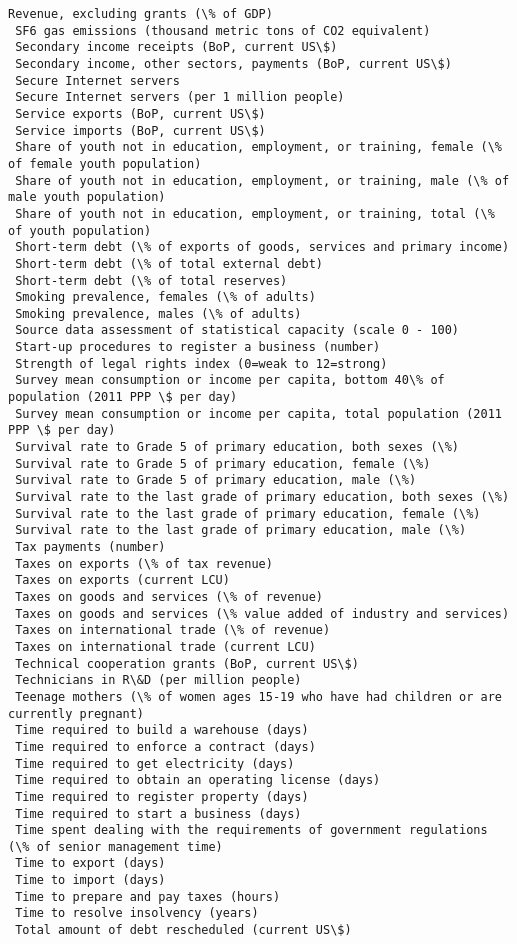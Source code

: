 \documentclass[11pt]{article}
\begin{document}
\begin{Verbatim}[commandchars=\\\{\}]
 Revenue, excluding grants (\% of GDP)
 SF6 gas emissions (thousand metric tons of CO2 equivalent)
 Secondary income receipts (BoP, current US\$)
 Secondary income, other sectors, payments (BoP, current US\$)
 Secure Internet servers
 Secure Internet servers (per 1 million people)
 Service exports (BoP, current US\$)
 Service imports (BoP, current US\$)
 Share of youth not in education, employment, or training, female (\% of female youth population)
 Share of youth not in education, employment, or training, male (\% of male youth population)
 Share of youth not in education, employment, or training, total (\% of youth population)
 Short-term debt (\% of exports of goods, services and primary income)
 Short-term debt (\% of total external debt)
 Short-term debt (\% of total reserves)
 Smoking prevalence, females (\% of adults)
 Smoking prevalence, males (\% of adults)
 Source data assessment of statistical capacity (scale 0 - 100)
 Start-up procedures to register a business (number)
 Strength of legal rights index (0=weak to 12=strong)
 Survey mean consumption or income per capita, bottom 40\% of population (2011 PPP \$ per day)
 Survey mean consumption or income per capita, total population (2011 PPP \$ per day)
 Survival rate to Grade 5 of primary education, both sexes (\%)
 Survival rate to Grade 5 of primary education, female (\%)
 Survival rate to Grade 5 of primary education, male (\%)
 Survival rate to the last grade of primary education, both sexes (\%)
 Survival rate to the last grade of primary education, female (\%)
 Survival rate to the last grade of primary education, male (\%)
 Tax payments (number)
 Taxes on exports (\% of tax revenue)
 Taxes on exports (current LCU)
 Taxes on goods and services (\% of revenue)
 Taxes on goods and services (\% value added of industry and services)
 Taxes on international trade (\% of revenue)
 Taxes on international trade (current LCU)
 Technical cooperation grants (BoP, current US\$)
 Technicians in R\&D (per million people)
 Teenage mothers (\% of women ages 15-19 who have had children or are currently pregnant)
 Time required to build a warehouse (days)
 Time required to enforce a contract (days)
 Time required to get electricity (days)
 Time required to obtain an operating license (days)
 Time required to register property (days)
 Time required to start a business (days)
 Time spent dealing with the requirements of government regulations (\% of senior management time)
 Time to export (days)
 Time to import (days)
 Time to prepare and pay taxes (hours)
 Time to resolve insolvency (years)
 Total amount of debt rescheduled (current US\$)

\end{Verbatim}
\end{document}
